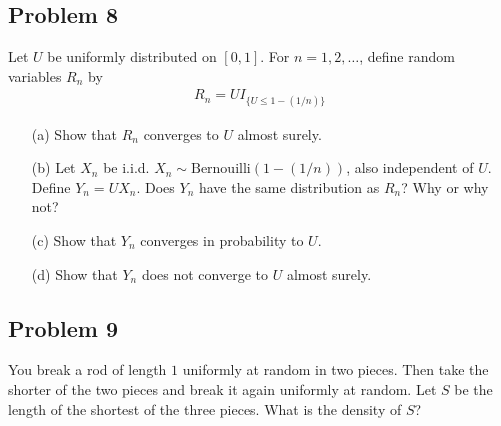 \subsection{Problem 8}
Let $U$ be uniformly distributed on $[0, 1]$. For $n = 1, 2, \ldots$, define random variables $R_n$ by
\begin{align}
    R_n = UI_{\{ U \le 1 - (1/n) \}}
\end{align}
\begin{enumerate}
    \item[(a)] Show that $R_n$ converges to $U$ almost surely.
    \item[(b)] Let $X_n$ be i.i.d. $X_n \sim \text{Bernouilli}(1 - (1/n))$, also independent of $U$. Define $Y_n = U X_n$. Does $Y_n$ have the same distribution as $R_n$? Why or why not?
    \item[(c)] Show that $Y_n$ converges in probability to $U$.
    \item[(d)] Show that $Y_n$ does not converge to $U$ almost surely.
\end{enumerate}
\begin{solution}

\end{solution}


\subsection{Problem 9}
You break a rod of length $1$ uniformly at random in two pieces. Then take the shorter of the two pieces and break it again uniformly at random. Let $S$ be the length of the shortest of the three pieces. What is the density of $S$?
\begin{solution}

\end{solution}

